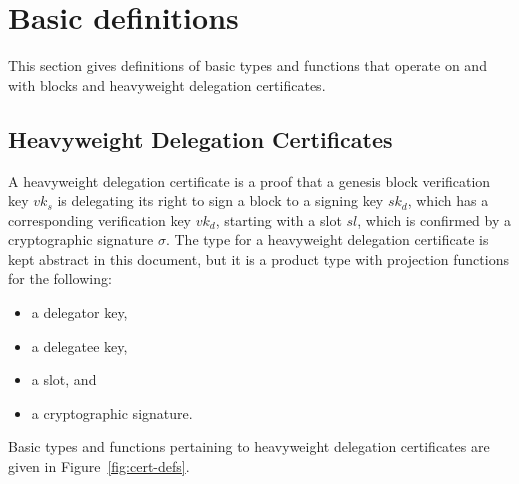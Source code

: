 \documentclass[11pt,a4paper]{article}
\begin{document}
\section{Basic definitions}
\label{sec:basic-definitions}

This section gives definitions of basic types and functions that operate on
and with blocks and heavyweight delegation certificates.


\subsection{Heavyweight Delegation Certificates}
\label{sec:certificates}

A heavyweight delegation certificate is a proof that a genesis block
verification key $vk_s$ is delegating its right to sign a block to a signing
key $sk_d$, which has a corresponding verification key $vk_d$, starting with a
slot $sl$, which is confirmed by a cryptographic signature $\sigma$.
%
The type for a heavyweight delegation certificate is kept abstract in this
document, but it is a product type with projection functions for the
following:
%
\begin{itemize}
\item a delegator key,
\item a delegatee key,
\item a slot, and
\item a cryptographic signature.
\end{itemize}

Basic types and functions pertaining to heavyweight delegation certificates
are given in Figure~\ref{fig:cert-defs}.
\end{document}
